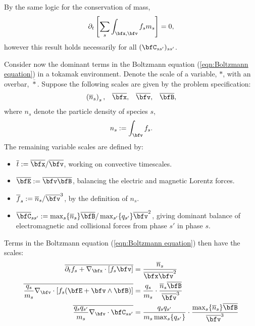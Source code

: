     \begin{remark}
        By the same logic for the conservation of mass,
        \begin{equation}
            \partial_{t}\left[\sum_{s}\int_{\bfx, \bfv}f_{s}m_{s}\right]  =  0,
        \end{equation}
        however this result holds necessarily for all $(\bfC_{ss'})_{ss'}$.
    \end{remark}
    
    \line
    
    Consider now the dominant terms in the Boltzmann equation (\ref{eqn:Boltzmann equation}) in a tokamak environment. Denote the scale of a variable, $*$, with an overbar, $\overline{*}$. Suppose the following scales are given by the problem specification:
    \begin{align}
        \left(\overline{n}_{s}\right)_{s},         &&
        \overline{\bfx},                           &&
        \overline{\bfv},                           &&
        \overline{\bfB},
    \end{align}
    where $n_{s}$ denote the particle density of species $s$,
    \begin{equation}
        n_{s}  :=  \int_{\bfv}f_{s}.
    \end{equation}
    The remaining variable scales are defined by:
    \begin{itemize}
        \item  $\overline{t}           :=  \overline{\bfx}/\overline{\bfv}$, working on convective timescales.
        \item  $\overline{\bfE}        :=  \overline{\bfv}\overline{\bfB}$, balancing the electric and magnetic Lorentz forces. 
        \item  $\overline{f}_{s}       :=  \overline{n}_{s}/\overline{\bfv}^{3}$, by the definition of $n_{s}$.
        \item  $\overline{\bfC}_{ss'}  :=  \max_{s}\{\overline{n}_{s}\}\overline{\bfB}/\max_{s'}\{q_{s'}\}\overline{\bfv}^{2}$, giving dominant balance of electromagnetic and collisional forces from phase $s'$ in phase $s$. 
    \end{itemize}
    
    Terms in the Boltzmann equation (\ref{eqn:Boltzmann equation}) then have the scales:
    \begin{align}
        \overline{\partial_{t}f_{s} + \nabla_{\bfx}\cdot[f_{s}\bfv]}  &=  \frac{\overline{n}_{s}}{\overline{\bfx}\overline{\bfv}^{2}}  \\
        \overline{\frac{q_{s}}{m_{s}}\nabla_{\bfv}\cdot[f_{s}(\bfE + \bfv\wedge\bfB)]}  &=  \frac{q_{s}}{m_{s}}\cdot\frac{\overline{n}_{s}\overline{\bfB}}{\overline{\bfv}^{3}}  \\
        \overline{\frac{q_{s}q_{s'}}{m_{s}}\nabla_{\bfv}\cdot\bfC_{ss'}}  &=  \frac{q_{s}q_{s'}}{m_{s}\max_{s}\{q_{s'}\}}\cdot\frac{\max_{s}\{\overline{n}_{s}\}\overline{\bfB}}{\overline{\bfv}^{3}}
    \end{align}

